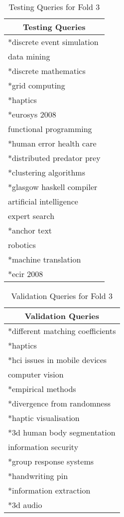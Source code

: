 \begin{table}
\centering
\begin{tabular}{|l|}
\hline \multicolumn{1}{|c|}{\textbf{Testing Queries}} \\
\hline *discrete event simulation \\
\hline data mining \\
\hline *discrete mathematics \\
\hline *grid computing \\ 
\hline *haptics \\
\hline *eurosys 2008 \\ 
\hline functional programming \\
\hline *human error health care \\ 
\hline *distributed predator prey \\
\hline *clustering algorithms \\ 
\hline *glasgow haskell compiler \\
\hline artificial intelligence \\ 
\hline expert search \\
\hline *anchor text \\
\hline robotics \\
\hline *machine translation \\
\hline *ecir 2008 \\
\hline
\end{tabular}
\caption{Testing Queries for Fold 3} \label{table:fold3testing}
\end{table}

\begin{table}
\centering
\begin{tabular}{|l|}
\hline \multicolumn{1}{|c|}{\textbf{Validation Queries}} \\
\hline *different matching coefficients \\
\hline *haptics \\
\hline *hci issues in mobile devices \\
\hline computer vision \\ 
\hline *empirical methods \\
\hline *divergence from randomness \\ 
\hline *haptic visualisation \\
\hline *3d human body segmentation \\ 
\hline information security \\
\hline *group response systems \\ 
\hline *handwriting pin \\
\hline *information extraction \\ 
\hline *3d audio \\
\hline
\end{tabular}
\caption{Validation Queries for Fold 3} \label{table:fold3validating}
\end{table}

